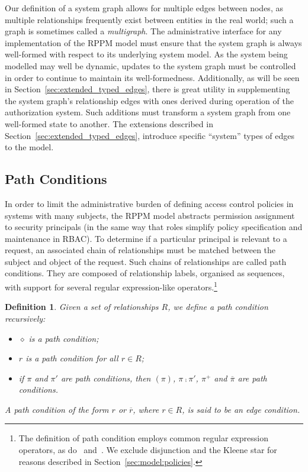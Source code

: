 \documentclass{article}
\newtheorem{definition}{Definition}
\begin{document}
Our definition of a system graph allows for multiple edges between nodes, as multiple relationships frequently exist between entities in the real world; such a graph is sometimes called a \emph{multigraph}.
The administrative interface for any implementation of the RPPM model must ensure that the system graph is always well-formed with respect to its underlying system model.
As the system being modelled may well be dynamic, updates to the system graph must be controlled in order to continue to maintain its well-formedness.
Additionally, as will be seen in Section~\ref{sec:extended_typed_edges}, there is great utility in supplementing the system graph's relationship edges with ones derived during operation of the authorization system.
Such additions must transform a system graph from one well-formed state to another.
The extensions described in Section~\ref{sec:extended_typed_edges}, introduce specific ``system'' types of edges to the model.

\subsection{Path Conditions}\label{sec:model:path_condition}
In order to limit the administrative burden of defining access control policies in systems with many subjects, the RPPM model abstracts permission assignment to security principals (in the same way that roles simplify policy specification and maintenance in RBAC).
To determine if a particular principal is relevant to a request, an associated chain of relationships must be matched between the subject and object of the request.
Such chains of relationships are called path conditions.
They are composed of relationship labels, organised as sequences, with support for several regular expression-like operators.\footnote{The definition of path condition employs common regular expression operators, as do~\cite{ChengPS12dbsec} and~\cite{KhanF12}. We exclude disjunction and the Kleene star for reasons described in Section~\ref{sec:model:policies}.}

\begin{definition}\label{def:path-condition}Given a set of relationships $R$, we define a \emph{path condition} recursively:
    \begin{itemize}
        \item $\diamond$ is a path condition;
        \item $r$ is a path condition for all $r \in R$;
        \item if $\pi$ and $\pi'$ are path conditions, then $(\pi)$, $\pi \comp \pi'$, $\pi^+$ and $\overline{\pi}$ are path conditions.
    \end{itemize}
   A path condition of the form $r$ or $\overline{r}$, where $r \in R$, is said to be an \emph{edge condition}.
\end{definition}
\end{document}
